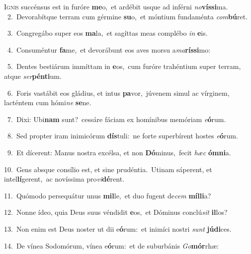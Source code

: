 \lettrine{\initial\textcolor{\initialcolor}{I}}{gnis} succénsus est in furóre \textbf{me}\-o,~\star et ardébit usque ad inférni \textit{no}\-\textbf{vís}\textbf{si}ma.\\
{\numbfont\textcolor{\numbcolor}{~2.}}~Devorabítque terram cum gérmine \textbf{su}\-o,~\star et móntium fundaménta \textit{com}\-\textbf{bú}ret.\par
{\numbfont\textcolor{\numbcolor}{~3.}}~Congregábo super eos \textbf{ma}\-la,~\star et sagíttas meas complébo \textit{in} \textbf{e}\-is.\par
{\numbfont\textcolor{\numbcolor}{~4.}}~Consuméntur \textbf{fa}\-me,~\star et devorábunt eos aves morsu a\-\textit{ma}\-\textbf{rís}\textbf{si}mo:\par
{\numbfont\textcolor{\numbcolor}{~5.}}~Dentes bestiárum immíttam in \textbf{e}\-os,~\star cum furóre trahéntium super terram, atque \textit{ser}\-\textbf{pén}\textbf{ti}um.\par
{\numbfont\textcolor{\numbcolor}{~6.}}~Foris vastábit eos gládius, et intus \textbf{pa}\-vor,~\star júvenem simul ac vírginem, lacténtem cum hómi\textit{ne} \textbf{se}\-ne.\par
{\numbfont\textcolor{\numbcolor}{~7.}}~Dixi: Ubi\textbf{nam} sunt?~\star cessáre fáciam ex homínibus memóriam \textit{e}\-\textbf{ó}rum.\par
{\numbfont\textcolor{\numbcolor}{~8.}}~Sed propter iram inimicórum \textbf{dís}\-tuli:~\star ne forte superbírent hostes \textit{e}\-\textbf{ó}rum.\par
{\numbfont\textcolor{\numbcolor}{~9.}}~Et dícerent: Manus nostra excélsa, et non \textbf{Dó}\-minus,~\star fecit \textit{hæc} \textbf{óm}\-\textbf{ni}a.\par
{\numbfont\textcolor{\numbcolor}{10.}}~Gens absque consílio est, et sine prudéntia.~\dagger Utinam sáperent, et intel\-\textbf{lí}\-gerent,~\star ac novíssima pro\-\textit{vi}\-\textbf{dé}rent.\par
{\numbfont\textcolor{\numbcolor}{11.}}~Quómodo persequátur unus \textbf{mil}\-le,~\star et duo fugent de\textit{cem} \textbf{míl}\-\textbf{li}a?\par
{\numbfont\textcolor{\numbcolor}{12.}}~Nonne ídeo, quia Deus suus véndidit \textbf{e}\-os,~\star et Dóminus conclú\textit{sit} \textbf{il}\-los?\par
{\numbfont\textcolor{\numbcolor}{13.}}~Non enim est Deus noster ut dii e\-\textbf{ó}\-rum:~\star et inimíci nostri \textit{sunt} \textbf{jú}\-\textbf{di}ces.\par
{\numbfont\textcolor{\numbcolor}{14.}}~De vínea Sodomórum, vínea e\-\textbf{ó}\-rum:~\star et de suburbánis \textit{Go}\-\textbf{mór}rhæ:\par

